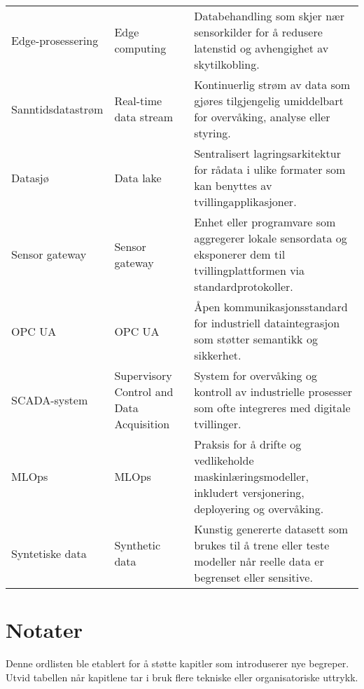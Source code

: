\begin{longtable}{p{}p{}p{}}
Edge-prosessering & Edge computing & Databehandling som skjer nær sensorkilder for å redusere latenstid og avhengighet av skytilkobling. \\
Sanntidsdatastrøm & Real-time data stream & Kontinuerlig strøm av data som gjøres tilgjengelig umiddelbart for overvåking, analyse eller styring. \\
Datasjø & Data lake & Sentralisert lagringsarkitektur for rådata i ulike formater som kan benyttes av tvillingapplikasjoner. \\
Sensor gateway & Sensor gateway & Enhet eller programvare som aggregerer lokale sensordata og eksponerer dem til tvillingplattformen via standardprotokoller. \\
OPC UA & OPC UA & Åpen kommunikasjonsstandard for industriell dataintegrasjon som støtter semantikk og sikkerhet. \\
SCADA-system & Supervisory Control and Data Acquisition & System for overvåking og kontroll av industrielle prosesser som ofte integreres med digitale tvillinger. \\
MLOps & MLOps & Praksis for å drifte og vedlikeholde maskinlæringsmodeller, inkludert versjonering, deployering og overvåking. \\
Syntetiske data & Synthetic data & Kunstig genererte datasett som brukes til å trene eller teste modeller når reelle data er begrenset eller sensitive. \\
\bottomrule
\end{longtable}

\section{Notater}
Denne ordlisten ble etablert for å støtte kapitler som introduserer nye begreper. Utvid tabellen når kapitlene tar i bruk flere tekniske eller organisatoriske uttrykk.
